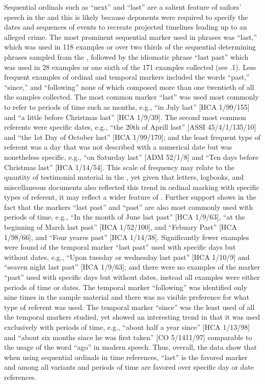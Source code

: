 Sequential ordinals such as “next” and “last” are a salient feature of sailors’ speech in the  and this is likely because deponents were required to specify the dates and sequences of events to recreate projected timelines leading up to an alleged crime. The most prominent sequential marker used in  phrases was “last,” which was used in 118 examples or over two thirds of the sequential determining phrases sampled from the , followed by the idiomatic phrase “last past” which was used in 28 examples or one sixth of the 171 examples collected (see .1). Less frequent examples of ordinal and temporal markers included the words “past,” “since,” and “following” none of which composed more than one twentieth of all the samples collected. The most common marker “last” was used most commonly to refer to periods of time such as months, e.g., “in July last” [HCA 1/99/155] and “a little before Christmas last” [HCA 1/9/39]. The second most common referents were specific dates, e.g., “the 20th of Aprill last” [ASSI 45/4/1/135/10] and “the 1st Day of October last” [HCA 1/99/170]; and the least frequent type of referent was a day that was not described with a numerical date but was nonetheless specific, e.g., “on Saturday last” [ADM 52/1/8] and “Ten days before Christmas last” [HCA 1/14/54]. This scale of frequency may relate to the quantity of testimonial material in the , yet given that letters, logbooks, and miscellaneous documents also reflected this trend in ordinal marking with specific types of referent, it may reflect a wider feature of . Further support shows in the fact that the markers “last past” and “past” are also most commonly used with periods of time, e.g., “In the month of June last past” [HCA 1/9/63], “at the beginning of March last past” [HCA 1/52/100], and “Febuary Past” [HCA 1/98/66], and “Four yeares past” [HCA 1/14/38]. Significantly fewer examples were found of the temporal marker “last past” used with specific days but without dates, e.g., “Upon tuesday or wednesday last past” [HCA 1/10/9] and “seaven night last past” [HCA 1/9/63]; and there were no examples of the marker “past” used with specific days but without dates, instead all examples were either periods of time or dates. The temporal marker “following” was identified only nine times in the sample material and there was no visible preference for what type of referent was used. The temporal marker “since” was the least used of all the temporal markers studied, yet showed an interesting trend in that it was used exclusively with periods of time, e.g., “about half a year since” [HCA 1/13/98] and “about six months since he was first taken” [CO 5/1411/97] comparable to the usage of the word “ago” in modern speech. Thus, overall, the data show that when using sequential ordinals in time references, “last” is the favored marker and among all variants and periods of time are favored over specific day or date references. 

